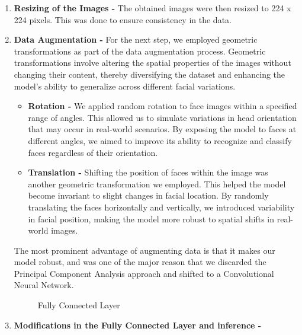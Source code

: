 \documentclass{article}
\begin{document}
    \begin{enumerate}
        \item \textbf{Resizing of the Images - }The obtained images were then resized to 224 x 224 pixels. This was done to ensure consistency in the data.

        \item \textbf{Data Augmentation - }For the next step, we employed geometric transformations as part of the data augmentation process. Geometric transformations involve altering the spatial properties of the images without changing their content, thereby diversifying the dataset and enhancing the model's ability to generalize across different facial variations.

        \begin{itemize}
            \item \textbf{Rotation - }We applied random rotation to face images within a specified range of angles. This allowed us to simulate variations in head orientation that may occur in real-world scenarios.
            By exposing the model to faces at different angles, we aimed to improve its ability to recognize and classify faces regardless of their orientation.

            \item \textbf{Translation - }Shifting the position of faces within the image was another geometric transformation we employed. This helped the model become invariant to slight changes in facial location.
            By randomly translating the faces horizontally and vertically, we introduced variability in facial position, making the model more robust to spatial shifts in real-world images.
            
        \end{itemize}

        The most prominent advantage of augmenting data is that it makes our model robust, and was one of the major reason that we discarded the Principal Component Analysis approach and shifted to a Convolutional Neural Network.
   \begin{figure}[!hbt]
                \noindent{}
                \caption{Fully Connected Layer }
            \end{figure}
        \item \textbf{Modifications in the Fully Connected Layer and inference - }


\end{enumerate}
\end{document}
